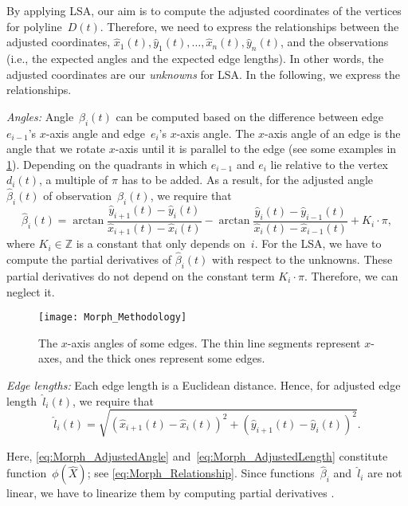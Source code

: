 By applying LSA, our aim is to compute the adjusted coordinates
of the vertices for polyline~$D(t)$.
Therefore, we need to express 
the relationships between the adjusted coordinates,
$\hat{x}_{1}(t),\hat{y}_{1}(t), \ldots,
\hat{x}_{n}(t),\hat{y}_{n}(t)$,
and the observations 
(i.e., the expected angles and the expected edge lengths).
In other words, the adjusted coordinates 
are our \emph{unknowns} for LSA.
In the following, we express the relationships.

\emph{Angles:} Angle~$\beta_{i}(t)$ can be computed based on 
the difference between edge~$e_{i - 1}$'s $x$-axis angle 
and edge~$e_{i}$'s $x$-axis angle. 
The $x$-axis angle of an edge is the angle that 
we rotate $x$-axis until it is parallel to the edge
(see some examples in \fig\ref{fig:Morph_AxisAngle}). 
Depending on the quadrants 
in which \(e_{i - 1}\) and \(e_{i}\) lie 
relative to the vertex $d_{i}(t)$, 
a multiple of \(\pi\) has to be added.
As a result, for the adjusted angle~$\hat{\beta}_{i}(t)$ 
of observation~$\beta_{i}(t)$,
we require that
\begin{equation}
\label{eq:Morph_AdjustedAngle}
\hat{\beta}_{i}(t) = 
\arctan\frac
{\hat{y}_{i+1}(t) - \hat{y}_{i}(t)}
{\hat{x}_{i+1}(t) - \hat{x}_{i}(t)} 
- 
\arctan\frac
{\hat{y}_{i}(t) - \hat{y}_{i-1}(t)}
{\hat{x}_{i}(t) - \hat{x}_{i-1}(t)} 
+
K_{i} \cdot \pi,
\end{equation}
where $K_{i}\in \mathbb{Z}$ 
is a constant that only depends on~$i$.
For the LSA, we have to compute the partial derivatives of 
$\hat{\beta}_{i}(t)$ with respect to the unknowns. 
These partial derivatives do not depend on the constant term
$K_{i} \cdot \pi$. 
Therefore, we can neglect it.

\begin{figure}[tb]
	\centering	
	\texttt{[image: Morph\_Methodology]}
	\caption{The $x$-axis angles of some edges.
		The thin line segments represent $x$-axes,
		and the thick ones represent some edges.
}
	\label{fig:Morph_AxisAngle}
\end{figure}

\emph{Edge lengths:} Each edge length is a Euclidean distance. 
Hence, for adjusted edge length~$\hat{l}_{i}(t)$, 
we require that
\begin{equation}
\label{eq:Morph_AdjustedLength}
\hat{l}_{i}(t) = 
\sqrt{
	(\hat{x}_{i + 1}(t) - \hat{x}_{i}(t))^2
	+ 
	(\hat{y}_{i + 1}(t) - \hat{y}_{i}(t))^2}.
\end{equation}

Here, \eqs\ref{eq:Morph_AdjustedAngle} 
and~\ref{eq:Morph_AdjustedLength} constitute
function~$\phi(\hat{X})$;
see \eq\ref{eq:Morph_Relationship}. 
Since functions~$\hat{\beta}_{i}$ 
and~$\hat{l}_{i}$ are not linear, 
we have to linearize them by computing partial derivatives
\parencite{Sester2000,Harrie2002}.


